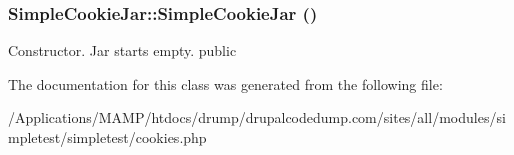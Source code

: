 \hypertarget{class_simple_cookie_jar_aa0adab8ed09f77f6826e6c37d9f2e0fc}{
\subsubsection[{SimpleCookieJar}]{\setlength{\rightskip}{0pt plus 5cm}SimpleCookieJar::SimpleCookieJar ()}}
\label{class_simple_cookie_jar_aa0adab8ed09f77f6826e6c37d9f2e0fc}
Constructor. Jar starts empty.  public 

The documentation for this class was generated from the following file:\begin{DoxyCompactItemize}
\item 
/Applications/MAMP/htdocs/drump/drupalcodedump.com/sites/all/modules/simpletest/simpletest/cookies.php\end{DoxyCompactItemize}
